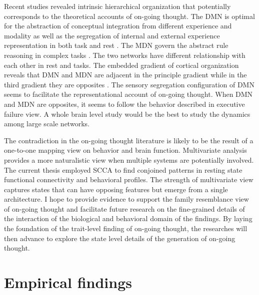 Recent studies revealed intrinsic hierarchical organization that potentially corresponds to the theoretical accounts of on-going thought. The DMN is optimal for the abstraction of conceptual integration from different experience and modality as well as the segregation of internal and external experience representation in both task and rest \cite{Murphy2018}. The MDN govern the abstract rule reasoning in complex tasks \cite{Duncan2010}. The two networks have different relationship with each other in rest and tasks. The embedded gradient of cortical organization reveals that DMN and MDN are adjacent in the principle gradient while in the third gradient they are opposites \cite{Margulies2016}. The sensory segregation configuration of DMN seems to facilitate the representational account of on-going thought. When DMN and MDN are opposites, it seems to follow the behavior described in executive failure view. A whole brain level study would be the best to study the dynamics among large scale networks. 

The contradiction in the on-going thought literature is likely to be the result of a one-to-one mapping view on behavior and brain function. Multivariate analysis provides a more naturalistic view when multiple systems are potentially involved. The current thesis employed SCCA \cite{WittenSCCA2009} to find conjoined patterns in resting state functional connectivity and behavioral profiles. The strength of multivariate view captures states that can have opposing features but emerge from a single architecture. I hope to provide evidence to support the family resemblance view of on-going thought and facilitate future research on the fine-grained details of the interaction of the biological and behavioral domain of the findings. By laying the foundation of the trait-level finding of on-going thought, the researches will then advance to explore the state level details of the generation of on-going thought.

\section{Empirical findings}
\label{ch:discussion:results}

